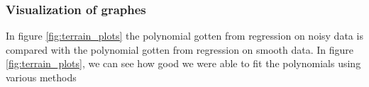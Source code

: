 \subsubsection{Visualization of graphes}
In figure \eqref{fig:terrain_plots} the polynomial gotten from regression on noisy data is compared with the polynomial gotten from regression on smooth data. 
 In figure \eqref{fig:terrain_plots}, we can see how good we were able to fit the polynomials using various methods


\begin{figure} [H]%
	\centering
	\\
	

\end{figure}
